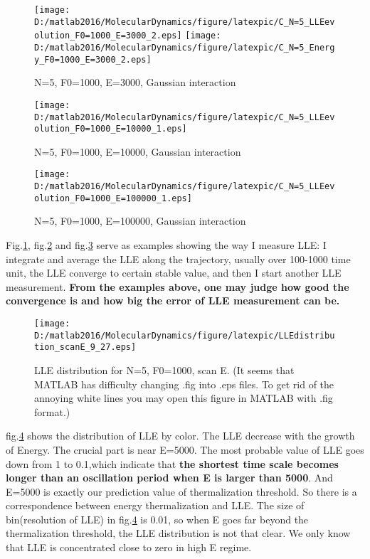 \documentclass[aps,pre,twocolumn
,groupedaddress]{revtex4-1}
\begin{document}
\begin{figure}[hbtp]
\centering
\texttt{[image: D:/matlab2016/MolecularDynamics/figure/latexpic/C\_N=5\_LLEevolution\_F0=1000\_E=3000\_2.eps]}
\texttt{[image: D:/matlab2016/MolecularDynamics/figure/latexpic/C\_N=5\_Energy\_F0=1000\_E=3000\_2.eps]} 
\caption{N=5, F0=1000, E=3000, Gaussian interaction}
\label{fig:LLEexample1}
\end{figure}
\begin{figure}[hbtp]
\centering
\texttt{[image: D:/matlab2016/MolecularDynamics/figure/latexpic/C\_N=5\_LLEevolution\_F0=1000\_E=10000\_1.eps]}
\caption{N=5, F0=1000, E=10000, Gaussian interaction}
\label{fig:LLEexample2}
\end{figure}
\begin{figure}[hbtp]
\centering
\texttt{[image: D:/matlab2016/MolecularDynamics/figure/latexpic/C\_N=5\_LLEevolution\_F0=1000\_E=100000\_1.eps]}
\caption{N=5, F0=1000, E=100000, Gaussian interaction}
\label{fig:LLEexample3}
\end{figure}

Fig.\ref{fig:LLEexample1}, fig.\ref{fig:LLEexample2} and fig.\ref{fig:LLEexample3} serve as examples showing the way I measure LLE: I integrate and average the LLE along the trajectory, usually over 100-1000 time unit, the LLE converge to certain stable value, and then I start another LLE measurement. \textbf{From the examples above, one may judge how good the convergence is and how big the error of LLE measurement can be.}


\begin{figure}[hbtp]
\centering
\texttt{[image: D:/matlab2016/MolecularDynamics/figure/latexpic/LLEdistribution\_scanE\_9\_27.eps]}
\caption{LLE distribution for N=5, F0=1000, scan E. (It seems that MATLAB has difficulty changing .fig into .eps files. To get rid of the annoying white lines you may open this figure in MATLAB with .fig format.)}
\label{fig:LLEdistribution1}
\end{figure}


fig.\ref{fig:LLEdistribution1} shows the distribution of LLE by color. The LLE decrease with the growth of Energy. The crucial part is near E=5000. The most probable value of LLE goes down from 1 to 0.1,which indicate that \textbf{the shortest time scale becomes longer than an oscillation period when E is larger than 5000}. And E=5000 is exactly our prediction value of thermalization threshold. So there is a correspondence between energy thermalization and LLE. 
The size of bin(resolution of LLE) in fig.\ref{fig:LLEdistribution1} is 0.01, so when E goes far beyond the thermalization threshold, the LLE distribution is not that clear. We only know that LLE is concentrated close to zero in high E regime.
\end{document}

